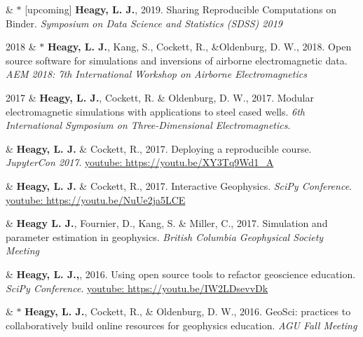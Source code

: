 \documentclass[a4paper, 11pt]{article}
\newcommand{\youtube}[1]{\href{https://youtu.be/XY3Tq9Wd1\_A}{youtube: #1}}
\begin{document}
\begin{entryright}
& $*$ [upcoming] \textbf{Heagy, L. J.}, 2019. Sharing Reproducible Computations on Binder. \emph{Symposium on Data Science and Statistics (SDSS) 2019}
\end{entryright}

\begin{entryright}
2018 & $*$ \textbf{Heagy, L. J.}, Kang, S., Cockett, R., \&Oldenburg, D. W., 2018. Open source software for simulations and inversions of airborne electromagnetic data. \emph{AEM 2018: 7th International Workshop on Airborne Electromagnetics}
\end{entryright}

\begin{entryright}
2017 & \textbf{Heagy, L. J.}, Cockett, R. \& Oldenburg, D. W., 2017. Modular electromagnetic simulations with applications to steel cased wells. \emph{6th International Symposium on Three-Dimensional Electromagnetics}.
\end{entryright}

\begin{entryright}
& \textbf{Heagy, L. J.} \& Cockett, R., 2017. Deploying a reproducible course. \emph{JupyterCon 2017}. \youtube{https://youtu.be/XY3Tq9Wd1\_A}
\end{entryright}

\begin{entryright}
& \textbf{Heagy, L. J.} \& Cockett, R., 2017. Interactive Geophysics. \emph{SciPy Conference}. \youtube{https://youtu.be/NuUe2ja5LCE}
\end{entryright}

\begin{entryright}
& \textbf{Heagy L. J.}, Fournier, D., Kang, S. \& Miller, C., 2017. Simulation and parameter estimation in geophysics. \emph{British Columbia Geophysical Society Meeting}
\end{entryright}

\begin{entryright}
& \textbf{Heagy, L. J.,}, 2016. Using open source tools to refactor geoscience education. \emph{SciPy Conference}. \youtube{https://youtu.be/IW2LDsevvDk}
\end{entryright}

\begin{entryright}
& $*$ \textbf{Heagy, L. J.}, Cockett, R., \& Oldenburg, D. W., 2016. GeoSci: practices to collaboratively build online resources for geophysics education. \emph{AGU Fall Meeting}
\end{entryright}
\end{document}

